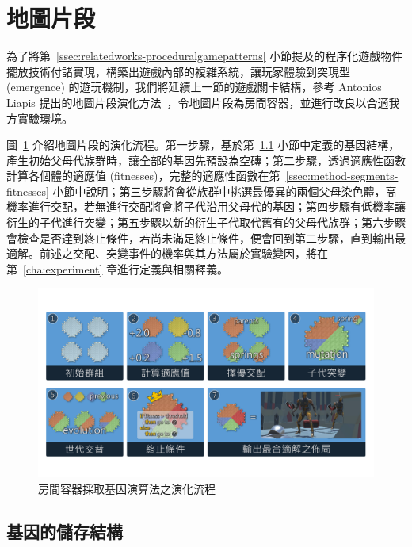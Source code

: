 \clearpage

\section{地圖片段}
\label{sec:method-segments}

為了將第~\ref{ssec:relatedworks-proceduralgamepatterns} 小節提及的程序化遊戲物件擺放技術付諸實現，構築出遊戲內部的複雜系統，讓玩家體驗到突現型 (emergence) 的遊玩機制，我們將延續上一節的遊戲關卡結構，參考 Antonios Liapis 提出的地圖片段演化方法~\cite{liapis2017multi}，令地圖片段為房間容器，並進行改良以合適我方實驗環境。

圖~\ref{fig:segments-with-ga} 介紹地圖片段的演化流程。第一步驟，基於第~\ref{ssec:method-segments-gene} 小節中定義的基因結構，產生初始父母代族群時，讓全部的基因先預設為空磚；第二步驟，透過適應性函數計算各個體的適應值 (fitnesses)，完整的適應性函數在第~\ref{ssec:method-segments-fitnesses} 小節中說明；第三步驟將會從族群中挑選最優異的兩個父母染色體，高機率進行交配，若無進行交配將會將子代沿用父母代的基因；第四步驟有低機率讓衍生的子代進行突變；第五步驟以新的衍生子代取代舊有的父母代族群；第六步驟會檢查是否達到終止條件，若尚未滿足終止條件，便會回到第二步驟，直到輸出最適解。前述之交配、突變事件的機率與其方法屬於實驗變因，將在第~\ref{cha:experiment} 章進行定義與相關釋義。

\begin{figure}[!htb]
  \begin{center}
    \includegraphics[width=1.0\textwidth]{figures/segments-with-ga.pdf}
    \caption{房間容器採取基因演算法之演化流程} 
    \label{fig:segments-with-ga}
  \end{center}
\end{figure}

\subsection{基因的儲存結構}
\label{ssec:method-segments-gene}

